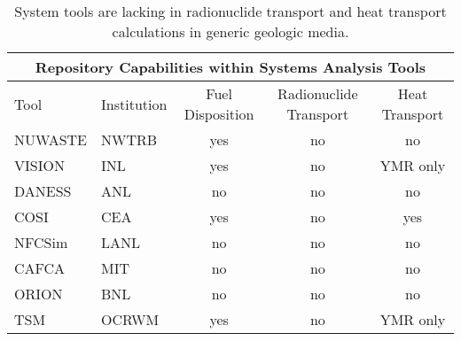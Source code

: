 %
\begin{table}
  \centering
  \footnotesize{
  \begin{tabular}{|l|l|c|c|c|}
    \multicolumn{5}{c}{\textbf{Repository Capabilities within Systems Analysis Tools}}\\
    \hline
    Tool & Institution & Fuel Disposition & Radionuclide Transport & Heat Transport  \\
    \hline
    NUWASTE\cite{abkowitz_nuclear_2010} & NWTRB & yes & no & no \\
    VISION \cite{yacout_vision_2006} & INL   & yes & no & YMR only \\
    DANESS \cite{van_den_durpel_daness:_2006} & ANL   & no & no & no \\
    COSI   \cite{boucher_international_2010} & CEA   & yes & no & yes \\
    NFCSim \cite{schneider_nfcsim_2004} & LANL  & no & no & no \\
    CAFCA  \cite{guerin_benchmark_2009} & MIT   & no & no & no \\
    ORION  \cite{guerin_benchmark_2009} & BNL   & no & no & no \\
    TSM    \cite{turner_discrete_2010} & OCRWM & yes & no & YMR only \\
    \hline
  \end{tabular}
  \caption[System Tools]{System tools are lacking in radionuclide transport and  
  heat transport calculations in generic geologic media.}
  \label{tab:systools}
  }
\end{table}



